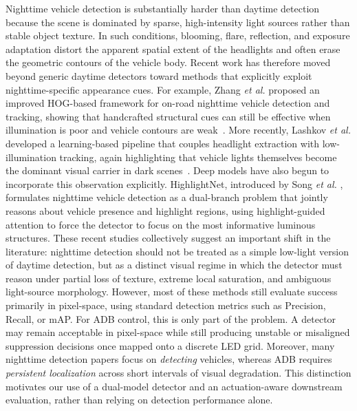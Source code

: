 \documentclass[pdflatex,sn-mathphys-num]{sn-jnl}%
\theoremstyle{thmstyleone}%
\theoremstyle{thmstyletwo}%
\theoremstyle{thmstylethree}%
\begin{document}
Nighttime vehicle detection is substantially harder than daytime detection because the scene is dominated by sparse, high-intensity light
sources rather than stable object texture. In such conditions, blooming, flare, reflection, and exposure adaptation distort the apparent spatial extent of the headlights and often erase the geometric contours of the vehicle body. Recent work has therefore moved beyond generic daytime detectors toward methods that explicitly exploit nighttime-specific
appearance cues. For example, Zhang \emph{et al.} proposed an improved HOG-based framework for on-road nighttime vehicle detection and tracking, showing that handcrafted structural cues can still be effective when illumination is poor and vehicle contours are weak~\cite{zhang2024vision}.
More recently, Lashkov \emph{et al.} developed a learning-based pipeline that couples headlight extraction with low-illumination tracking, again highlighting that vehicle lights themselves become the dominant visual
carrier in dark scenes~\cite{lashkov2025machine}.
Deep models have also begun to incorporate this observation explicitly. HighlightNet, introduced by Song \emph{et al.} \cite{song2025highlightnet}, formulates nighttime vehicle detection as a dual-branch problem that jointly reasons about vehicle presence and highlight regions, using highlight-guided attention to force the detector to focus on the most informative luminous structures. These recent studies collectively suggest an important shift in the literature: nighttime detection should not be treated as a simple low-light version of daytime detection, but as a distinct visual regime in which the detector must reason under partial loss of texture, extreme local saturation, and ambiguous light-source morphology.
However, most of these methods still evaluate success primarily in pixel-space, using standard detection metrics such as Precision, Recall, or mAP. For ADB control, this is only part of the problem. A detector may remain acceptable in pixel-space while still producing unstable or misaligned suppression decisions once mapped onto a discrete LED grid. Moreover, many nighttime detection papers focus on \emph{detecting} vehicles, whereas ADB requires \emph{persistent localization} across short intervals of visual degradation. This distinction motivates our use of a
dual-model detector and an actuation-aware downstream evaluation, rather
than relying on detection performance alone.

\end{document}
